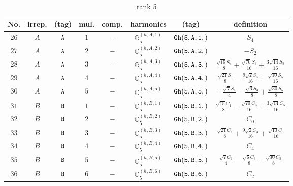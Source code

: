 \documentclass[fleqn,8pt]{jsarticle}
\begin{document}
\begin{table}[ht!]
\begin{center}
\caption{rank 5}
\renewcommand{\arraystretch}{1.3}
\begin{tabular}{cccccccc} \hline \hline
No. & irrep. & (tag) & mul. & comp. & harmonics & (tag) & definition \\ \hline
$ 26 $ & $ A $ & $ {\tt A} $ & $ 1 $ & $ - $ & $ \mathbb{G}_{5}^{(h,A,1)} $ & $ {\tt Gh(5,A,1,)} $ & $ S_{4} $ \\
$ 27 $ & $ A $ & $ {\tt A} $ & $ 2 $ & $ - $ & $ \mathbb{G}_{5}^{(h,A,2)} $ & $ {\tt Gh(5,A,2,)} $ & $ - S_{2} $ \\
$ 28 $ & $ A $ & $ {\tt A} $ & $ 3 $ & $ - $ & $ \mathbb{G}_{5}^{(h,A,3)} $ & $ {\tt Gh(5,A,3,)} $ & $ \frac{\sqrt{15} S_{1}}{8} + \frac{\sqrt{70} S_{3}}{16} + \frac{3 \sqrt{14} S_{5}}{16} $ \\
$ 29 $ & $ A $ & $ {\tt A} $ & $ 4 $ & $ - $ & $ \mathbb{G}_{5}^{(h,A,4)} $ & $ {\tt Gh(5,A,4,)} $ & $ \frac{\sqrt{21} S_{1}}{8} - \frac{9 \sqrt{2} S_{3}}{16} + \frac{\sqrt{10} S_{5}}{16} $ \\
$ 30 $ & $ A $ & $ {\tt A} $ & $ 5 $ & $ - $ & $ \mathbb{G}_{5}^{(h,A,5)} $ & $ {\tt Gh(5,A,5,)} $ & $ - \frac{\sqrt{7} S_{1}}{4} - \frac{\sqrt{6} S_{3}}{8} + \frac{\sqrt{30} S_{5}}{8} $ \\
$ 31 $ & $ B $ & $ {\tt B} $ & $ 1 $ & $ - $ & $ \mathbb{G}_{5}^{(h,B,1)} $ & $ {\tt Gh(5,B,1,)} $ & $ \frac{\sqrt{15} C_{1}}{8} - \frac{\sqrt{70} C_{3}}{16} + \frac{3 \sqrt{14} C_{5}}{16} $ \\
$ 32 $ & $ B $ & $ {\tt B} $ & $ 2 $ & $ - $ & $ \mathbb{G}_{5}^{(h,B,2)} $ & $ {\tt Gh(5,B,2,)} $ & $ C_{0} $ \\
$ 33 $ & $ B $ & $ {\tt B} $ & $ 3 $ & $ - $ & $ \mathbb{G}_{5}^{(h,B,3)} $ & $ {\tt Gh(5,B,3,)} $ & $ \frac{\sqrt{21} C_{1}}{8} + \frac{9 \sqrt{2} C_{3}}{16} + \frac{\sqrt{10} C_{5}}{16} $ \\
$ 34 $ & $ B $ & $ {\tt B} $ & $ 4 $ & $ - $ & $ \mathbb{G}_{5}^{(h,B,4)} $ & $ {\tt Gh(5,B,4,)} $ & $ C_{4} $ \\
$ 35 $ & $ B $ & $ {\tt B} $ & $ 5 $ & $ - $ & $ \mathbb{G}_{5}^{(h,B,5)} $ & $ {\tt Gh(5,B,5,)} $ & $ \frac{\sqrt{7} C_{1}}{4} - \frac{\sqrt{6} C_{3}}{8} - \frac{\sqrt{30} C_{5}}{8} $ \\
$ 36 $ & $ B $ & $ {\tt B} $ & $ 6 $ & $ - $ & $ \mathbb{G}_{5}^{(h,B,6)} $ & $ {\tt Gh(5,B,6,)} $ & $ C_{2} $ \\
 \hline \hline
\end{tabular}
\end{center}
\end{table}
\end{document}
